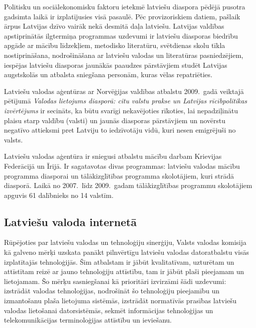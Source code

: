 \begin{multicols}{2}
Politisku un sociālekonomisku faktoru ietekmē latviešu diaspora pēdējā pusotra gadsimta laikā ir izplatījusies visā pasaulē.  Pēc provizoriskiem datiem, pašlaik ārpus Latvijas dzīvo vairāk nekā desmitā daļa latviešu.  Latvijas valdības apstiprinātās ilgtermiņa programmas uzdevumi ir latviešu diasporas biedrību apgāde ar mācību līdzekļiem, metodisko literatūru, svētdienas skolu tīkla nostiprināšana, nodrošināšana ar latviešu valodas un literatūras pasniedzējiem, iespējas latviešu diasporas jaunākās paaudzes pārstāvjiem studēt Latvijas augstskolās un atbalsta sniegšana personām, kuras vēlas repatriēties.

Latviešu valodas aģentūras ar Norvēģijas valdības atbalstu 2009.~gadā veiktajā pētījumā \textit{Valodas lietojums diasporā: citu valstu prakse un Latvijas rīcībpolitikas izvērtējums} \cite{Meta4} ir secināts, ka būtu svarīgi nekavējoties rīkoties, lai nepadziļinātu plaisu starp valdību (valsti) un jaunās diasporas pārstāvjiem un novērstu negatīvo attieksmi pret Latviju to iedzīvotāju vidū, kuri nesen emigrējuši no valsts.

Latviešu valodas aģentūra ir sniegusi atbalstu mācību darbam Krievijas Federācijā un Īrijā. 
Ir sagatavotas divas programmas: latviešu valodas mācību programma diasporai un tālākizglītības programma skolotājiem, kuri strādā diasporā. 
Laikā no 2007.~līdz 2009.~gadam tālākizglītības programmu skolotājiem apguvis 61 dalībnieks no 14 valstīm.

\subsection{Latviešu valoda internetā}

Rūpējoties par latviešu valodas un tehnoloģiju sinerģiju, Valsts valodas komisija kā galveno mērķi uzskata panākt pilnvērtīgu latviešu valodas datoratbalstu visās izplatītajās tehnoloģijās.  Šim atbalstam ir jābūt kvalitatīvam, uzturētam un attīstītam reizē ar jauno tehnoloģiju attīstību, tam ir jābūt plaši pieejamam un lietojamam.  Šo mērķu sasniegšanai kā prioritāri izvirzāmi šādi uzdevumi: izstrādāt valodas tehnoloģijas, nodrošināt šo tehnoloģiju pieejamību un izmantošanu plaša lietojuma sistēmās, izstrādāt normatīvās prasības latviešu valodas lietošanai datorsistēmās, sekmēt informācijas tehnoloģijas un telekomunikācijas terminoloģijas attīstību un ieviešanu.



\end{multicols}
